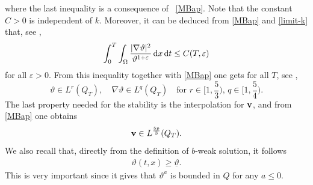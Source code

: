 \documentclass[11pt, a4paper, reqno]{amsart}
\numberwithin{equation}{section}
\newcommand{\vc}[1]{{\bf #1}}
\newcommand{\vv}{\vc{v}}
\newcommand{\thet}{\vartheta}
\newcommand{\dt}{\,{\rm d} t }
\newcommand{\dx}{\,{\rm d} {x}}
\newcommand{\dxdt}{\dx  \dt}
\newcommand{\intTO}[1]{\int_0^T \int_{\Omega} #1  \dxdt}
\newcommand{\tmin}{\underline{\thet}}
\newcommand{\bb}{b}
\newcommand{\bws}{$\bb$-weak solution}
\begin{document}
where the last inequality is a consequence of ~\eqref{MBap}. Note that the constant $C>0$ is independent of $k$. Moreover, it can be deduced from \eqref{MBap} and \eqref{limit-k} that, see \cite[Section 3.5, (3.20)]{AbBuKa2024},
\begin{equation}\label{eq:reg-grad-thet}
  \intTO{\frac{|\nabla \thet|^2}{\thet^{1+\varepsilon}}}\le C(T,\varepsilon)
\end{equation}
for all $\varepsilon >0$. From this inequality together with \eqref{MBap} one gets for all $T$, see \cite[Appendix~B.5]{BuFeMa2009},
\begin{equation}\label{eq:reg-thet1}
  \thet\in L^{r}(Q_T),\quad\nabla\thet\in L^q(Q_T)\quad\mbox{for $r\in[1,\frac53)$, $q\in[1,\frac54)$.}
\end{equation}
The last property needed for the stability is the interpolation for $\vv$, and from \eqref{MBap} one obtains
\begin{equation}\label{eq:reg-v1}
  \vv \in L^{\frac{5p}{3}}(Q_T).
\end{equation}
We also recall that, directly from the definition of \bws, it follows
%
\begin{equation}\label{ap-theta2}
\begin{split}
\thet(t,x)\ge \tmin.
\end{split}
\end{equation}
This is very important since it gives that $\thet^a$ is bounded in $Q$ for any $a\leq0$.
\end{document}
